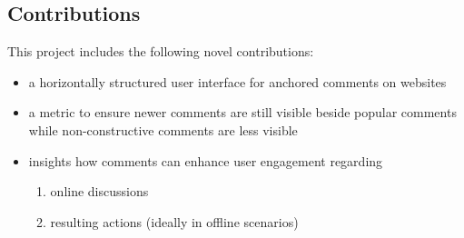 \subsection{Contributions}

This project includes the following novel contributions:

\begin{itemize}
\item a horizontally structured user interface for anchored comments on websites
\item a metric to ensure newer comments are still visible beside popular comments while non-constructive comments are less visible
\item insights how comments can enhance user engagement regarding
\begin{enumerate}
\item online discussions
\item resulting actions (ideally in offline scenarios)
\end{enumerate}

\end{itemize}